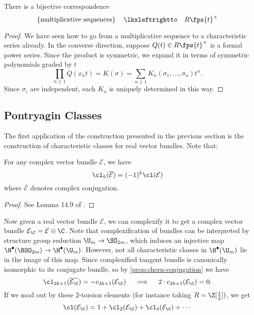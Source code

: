 \begin{theorem}
	There is a bijective correspondence
	\[
		\left\{\parbox{10.5em}{multiplicative sequences}\right\} \quad\lkxleftrightto\quad R\fps{t}^\times
	\]
\end{theorem}
\begin{proof}
	We have seen how to go from a multiplicative sequence to a characteristic series already. In the converse direction, suppose $Q(t)\in R\fps{t}^\times$ is a formal power series. Since the product is symmetric, we expand it in terms of symmetric polynomials graded by $t$
	\[
		 \prod_{n\geq 1} Q(x_n t) = K(\sigma)= \sum_{n\geq 1}K_n(\sigma_1,\ldots, \sigma_n) t^n.
	\]
	Since $\sigma_i$ are independent, each $K_n$ is uniquely determined in this way.
\end{proof}

\subsection{Pontryagin Classes}

The first application of the construction presented in the previous section is the construction of characteristic classes for real vector bundles. Note that:
\begin{proposition}\label{prop:chern-conjugation}
	For any complex vector bundle $\mathcal{E}$, we have
	\[
		\cl_k(\overline{\mathcal{E}}) = (-1)^k\cl(\mathcal{E})
	\]
	where $\overline{\mathcal{E}}$ denotes complex conjugation.
\end{proposition}
\begin{proof}
	See Lemma 14.9 of \cite{milnorstasheff1974}.
\end{proof}

Now given a real vector bundle $\mathcal{E}$, we can complexify it to get a complex vector bundle $\mathcal{E}_\C = \mathcal{E}\otimes \C$. 
Note that complexification of bundles can be interpreted by structure group reduction $\U_m \to \SO_{2m}$, which induces an injective map $\H^\bullet(\BSO_{2m})\to \H^\bullet(\U_m)$. However, not all characteristic classes in $\H^\bullet(\U_m)$ lie in the image of this map. 
Since complexified tangent bundle is canonically isomorphic to its conjugate bundle, so by \cref{prop:chern-conjugation} we have
\[
	\cl_{2k+1}(\overline{\mathcal{E}_\C}) = -c_{2k+1}(\mathcal{E}_\C) \quad\implies\quad 2\cdot c_{2k+1}(\mathcal{E}_\C) = 0.
\]
If we mod out by these $2$-torsion elements (for instance taking $R=\Z[\frac{1}{2}])$, we get
\[
	\cl(\mathcal{E}_\C) = 1+\cl_2(\mathcal{E}_\C) + \cl_4(\mathcal{E}_\C)+\cdots
\]

